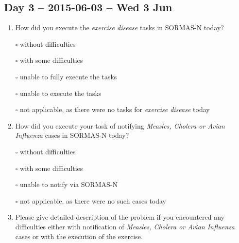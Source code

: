\documentclass[a4paper, titlepage]{tufte-handout}
\begin{document}
\subsection{Day 3 -- 2015-06-03 -- Wed  3 Jun}
\label{sec-8-3}
\begin{enumerate}
\item How did you execute the \emph{exercise disease} tasks in SORMAS-N today?

\quad $\square$ without difficulties

\quad $\square$ with some difficulties

\quad $\square$ unable to fully execute the tasks

\quad $\square$ unable to execute the tasks

\quad $\square$ not applicable, as there were no tasks for \emph{exercise disease} today

\item How did you execute your task of notifying \emph{Measles, Cholera or Avian Influenza} cases in SORMAS-N today?

\quad $\square$ without difficulties

\quad $\square$ with some difficulties

\quad $\square$ unable to notify via SORMAS-N

\quad $\square$ not applicable, as there were no such cases today

\item Please give detailed description of the problem if you encountered any difficulties either with notification of \emph{Measles, Cholera or Avian Influenza} cases or with the execution of the exercise.

\hrulefill

\hrulefill

\hrulefill

\hrulefill

\hrulefill

\hrulefill

\hrulefill

\hrulefill

\hrulefill

\hrulefill
\end{enumerate}

\newpage
\end{document}
